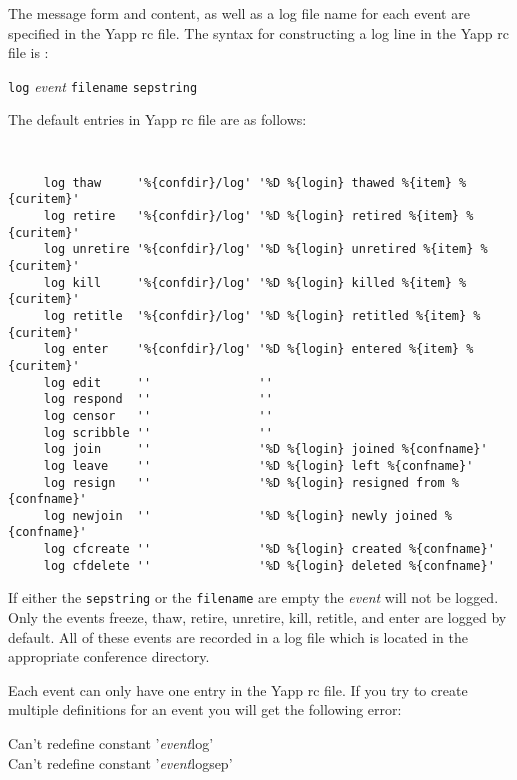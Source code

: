\documentclass[twoside]{report}
\begin{document}
      The message form and content, as well as a log file name for each 
         event are specified in the Yapp rc file. 
         The syntax for constructing a log line in the Yapp rc file is :
   
     {\hspace{20pt} {\tt log} {\em event} {\tt filename} {\tt sepstring} }
        
         The default entries in  Yapp rc file are as follows:
   
   {
     \tt
     \begin{verbatim}
     log thaw     '%{confdir}/log' '%D %{login} thawed %{item} %{curitem}'
     log retire   '%{confdir}/log' '%D %{login} retired %{item} %{curitem}'
     log unretire '%{confdir}/log' '%D %{login} unretired %{item} %{curitem}'
     log kill     '%{confdir}/log' '%D %{login} killed %{item} %{curitem}'
     log retitle  '%{confdir}/log' '%D %{login} retitled %{item} %{curitem}'
     log enter    '%{confdir}/log' '%D %{login} entered %{item} %{curitem}'
     log edit     ''               ''
     log respond  ''               ''
     log censor   ''               ''
     log scribble ''               ''
     log join     ''               '%D %{login} joined %{confname}'
     log leave    ''               '%D %{login} left %{confname}'
     log resign   ''               '%D %{login} resigned from %{confname}'
     log newjoin  ''               '%D %{login} newly joined %{confname}'
     log cfcreate ''               '%D %{login} created %{confname}'
     log cfdelete ''               '%D %{login} deleted %{confname}'
   \end{verbatim}
   }
   
         \vspace{12pt}
         If either the {\tt sepstring} or the {\tt filename} are empty the 
         {\em event} will not be logged. Only the events freeze, thaw, retire, 
         unretire, kill, retitle, and enter are logged by default. 
         All of these events are recorded in a log file which 
         is located in the appropriate conference directory.
   
         Each event can only have one entry in the Yapp rc file.  If you 
         try to create multiple definitions for an event you will get
         the following error:
   
         {\centering Can't redefine constant '{\em event}log'   }\\
         {\centering Can't redefine constant '{\em event}logsep'}\\
   
\end{document}

